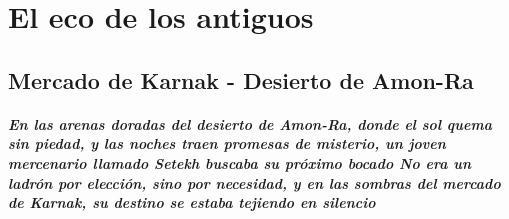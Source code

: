 \section{El eco de los antiguos}
\subsection{Mercado de Karnak - Desierto de Amon-Ra}
\paragraph{\textit{En las arenas doradas del desierto de Amon-Ra, donde el sol quema sin piedad, y las noches traen promesas de misterio, un joven mercenario llamado Setekh buscaba su próximo bocado
No era un ladrón por elección, sino por necesidad, y en las sombras del mercado de Karnak, su destino se estaba tejiendo en silencio}\\}

